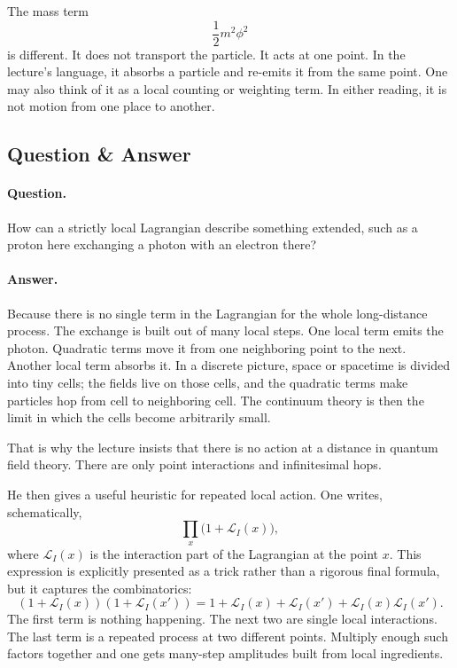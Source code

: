 The mass term
\begin{equation}
\frac12 m^2\phi^2
\end{equation}
is different. It does not transport the particle. It acts at one point. In the lecture's language, it absorbs a particle and re-emits it from the same point. One may also think of it as a local counting or weighting term. In either reading, it is not motion from one place to another.

\subsection{Question \& Answer}

\paragraph{Question.}
How can a strictly local Lagrangian describe something extended, such as a proton here exchanging a photon with an electron there?

\paragraph{Answer.}
Because there is no single term in the Lagrangian for the whole long-distance process. The exchange is built out of many local steps. One local term emits the photon. Quadratic terms move it from one neighboring point to the next. Another local term absorbs it. In a discrete picture, space or spacetime is divided into tiny cells; the fields live on those cells, and the quadratic terms make particles hop from cell to neighboring cell. The continuum theory is then the limit in which the cells become arbitrarily small.

That is why the lecture insists that there is no action at a distance in quantum field theory. There are only point interactions and infinitesimal hops.

He then gives a useful heuristic for repeated local action. One writes, schematically,
\begin{equation}
\prod_x \bigl(1+\mathcal L_I(x)\bigr),
\end{equation}
where \(\mathcal L_I(x)\) is the interaction part of the Lagrangian at the point \(x\). This expression is explicitly presented as a trick rather than a rigorous final formula, but it captures the combinatorics:
\begin{equation}
(1+\mathcal L_I(x))(1+\mathcal L_I(x'))
=
1+\mathcal L_I(x)+\mathcal L_I(x')+\mathcal L_I(x)\mathcal L_I(x').
\end{equation}
The first term is nothing happening. The next two are single local interactions. The last term is a repeated process at two different points. Multiply enough such factors together and one gets many-step amplitudes built from local ingredients.

